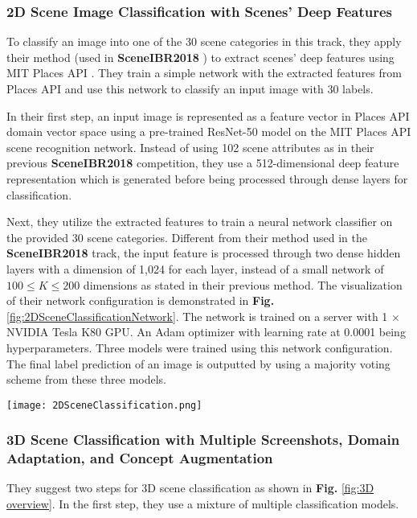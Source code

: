 \documentclass[../main.tex]{subfiles}
\begin{document}
	\subsubsection{2D Scene Image Classification with Scenes' Deep Features}
	
	To classify an image into one of the 30 scene categories in this track, 
	they apply their method (used in \textbf{SceneIBR2018} 
	\cite{SceneIBR18Website}) to extract scenes' deep features using MIT 
	Places API \cite{zhou2017places}. They train a simple network with the 
	extracted features from Places API and use this network to classify an 
	input image with 30 labels.
	
	In their first step, an input image is represented as a feature vector in 
	Places API domain vector space using a pre-trained ResNet-50 \cite{resnet} 
	model on the MIT Places API scene recognition network. Instead of using 102 
	scene attributes as in their previous \textbf{SceneIBR2018} competition, 
	they use a 512-dimensional deep feature representation which is generated 
	before being processed through dense layers for classification.
	
	Next, they utilize the extracted features to train a neural network classifier on the provided 30 scene categories. Different from their method used in the 
	\textbf{SceneIBR2018} track, the input feature is processed through two dense 
	hidden layers with a dimension of 1,024 for each layer, instead of a small 
	network of $100 \le K \le 200$ dimensions as stated in their previous 
	method. The visualization of their network configuration is demonstrated in 
	\textbf{Fig.} \ref{fig:2DSceneClassificationNetwork}. The network is 
	trained on a server with 1 $\times$ NVIDIA Tesla K80 GPU. An Adam optimizer 
	with learning rate at 0.0001 being hyperparameters. Three models were 
	trained using this network configuration. The final label prediction of an 
	image is outputted by using a majority voting scheme from these three 
	models.
	
	\begin{center}
		\texttt{[image: 2DSceneClassification.png]}
		\centering
		\label{fig:2DSceneClassificationNetwork}
	\end{center}
	
	
	\subsubsection{3D Scene Classification with Multiple Screenshots, Domain Adaptation, and Concept Augmentation}
	They suggest two steps for 3D scene classification as shown in 
	\textbf{Fig.} \ref{fig:3D overview}. In the first step, they use a mixture 
	of multiple classification models.
	
\end{document}
